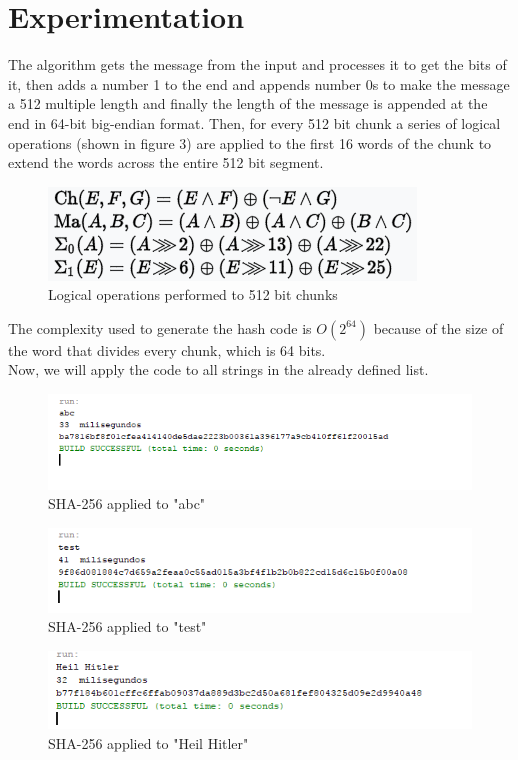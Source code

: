 \documentclass[journal]{IEEEtran}
\begin{document}
\section{Experimentation}
The algorithm gets the message from the input and processes it to get the bits of it, then adds a number 1 to the end and appends number 0s to make the message a 512 multiple length and finally the length of the message is appended at the end in 64-bit big-endian format. Then, for every 512 bit chunk a series of logical operations (shown in figure 3) are applied to the first 16 words of the chunk to extend the words across the entire 512 bit segment.
\begin{figure}[H] 
	\centering \includegraphics[width=.70\columnwidth]{logic.png}
	\caption{
		\label{fig:samplesetup}
		Logical operations performed to 512 bit chunks
	}
\end{figure}
The complexity used to generate the hash code is $O(2^{64})$ because of the size of the word that divides every chunk, which is 64 bits.\\
Now, we will apply the code to all strings in the already defined list.
\begin{figure}[H] 
	\centering \includegraphics[width=.70\columnwidth]{captura.png}
	\caption{
		\label{fig:samplesetup}
		SHA-256 applied to "abc"
	}
\end{figure}
\begin{figure}[H] 
	\centering \includegraphics[width=.70\columnwidth]{Code_test.png}
	\caption{
		\label{fig:samplesetup}
		SHA-256 applied to "test"
	}
\end{figure}
\begin{figure}[H] 
	\centering \includegraphics[width=.70\columnwidth]{Code_heil.png}
	\caption{
		\label{fig:samplesetup}
		SHA-256 applied to "Heil Hitler"
	}
\end{figure}
\end{document}
